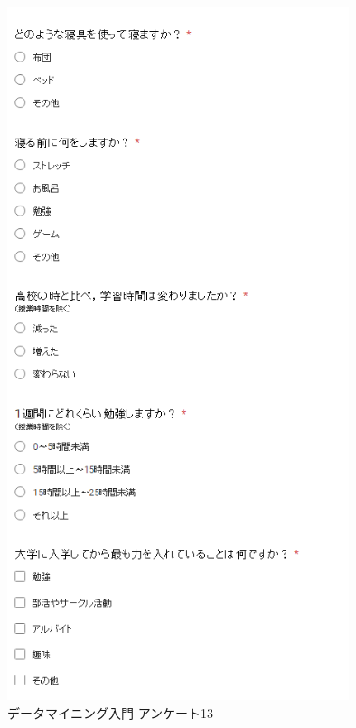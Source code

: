\begin{figure}[p]
\centering
\includegraphics[width=10cm]{forms16.PNG}
\caption{データマイニング入門 アンケート13}\label{サンプル図}
\end{figure}

